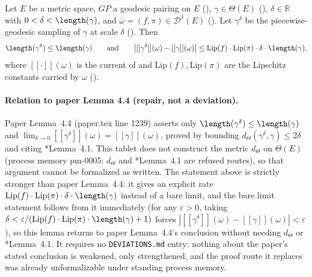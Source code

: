 \begin{lemma}
  Let $E$ be a metric space, $GP$ a geodesic pairing on $E$ (),
  $\gamma \in \Theta(E)$ (), $\delta \in \mathbb{R}$ with $0 < \delta <
  \length(\gamma)$, and $\omega = (f,\pi) \in \mathcal{D}^1(E)$ (). Let
  $\gamma^\delta$ be the piecewise-geodesic sampling of $\gamma$ at scale $\delta$
  (). Then
  \[
    \length(\gamma^\delta) \le \length(\gamma)
    \qquad\text{and}\qquad
    \bigl| [[\gamma^\delta]](\omega) - [[\gamma]](\omega) \bigr|
      \le \mathrm{Lip}(f) \cdot \mathrm{Lip}(\pi) \cdot \delta \cdot \length(\gamma)
    ,
  \]
  where $[[\cdot]](\omega)$ is the current of  and $\mathrm{Lip}(f),
  \mathrm{Lip}(\pi)$ are the Lipschitz constants carried by $\omega$ ().

  \paragraph{Relation to paper Lemma 4.4 (repair, not a deviation).} Paper Lemma~4.4 (paper.tex
  line 1239) asserts only $\length(\gamma^\delta) \le \length(\gamma)$ and
  $\lim_{\delta \to 0} [[\gamma^\delta]](\omega) = [[\gamma]](\omega)$, proved by bounding
  $d_\Theta(\gamma^\delta,\gamma) \le 2\delta$ and citing \cite{PS_2012}*{Lemma~4.1}. This tablet
  does not construct the metric $d_\Theta$ on $\Theta(E)$ (process memory pm-0005: $d_\Theta$ and
  \cite{PS_2012}*{Lemma~4.1} are refused routes), so that argument cannot be formalized as written.
  The statement above is strictly stronger than paper Lemma~4.4: it gives an explicit rate
  $\mathrm{Lip}(f)\cdot\mathrm{Lip}(\pi)\cdot\delta\cdot\length(\gamma)$ instead of a bare limit, and the
  bare limit statement follows from it immediately (for any $\varepsilon>0$, taking
  $\delta < \varepsilon / (\mathrm{Lip}(f)\cdot\mathrm{Lip}(\pi)\cdot\length(\gamma)+1)$ forces
  $|[[\gamma^\delta]](\omega)-[[\gamma]](\omega)|<\varepsilon$), so this lemma returns to paper
  Lemma~4.4's conclusion without needing $d_\Theta$ or \cite{PS_2012}*{Lemma~4.1}. It requires no
  \texttt{DEVIATIONS.md} entry: nothing about the paper's stated conclusion is weakened, only
  strengthened, and the proof route it replaces was already unformalizable under standing process
  memory.


\end{lemma}
